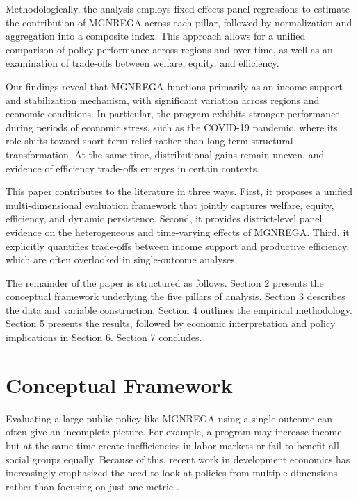 \documentclass[12pt]{article}
\begin{document}
Methodologically, the analysis employs fixed-effects panel regressions to estimate the contribution of MGNREGA across each pillar, followed by normalization and aggregation into a composite index. This approach allows for a unified comparison of policy performance across regions and over time, as well as an examination of trade-offs between welfare, equity, and efficiency.

Our findings reveal that MGNREGA functions primarily as an income-support and stabilization mechanism, with significant variation across regions and economic conditions. In particular, the program exhibits stronger performance during periods of economic stress, such as the COVID-19 pandemic, where its role shifts toward short-term relief rather than long-term structural transformation. At the same time, distributional gains remain uneven, and evidence of efficiency trade-offs emerges in certain contexts.

This paper contributes to the literature in three ways. First, it proposes a unified multi-dimensional evaluation framework that jointly captures welfare, equity, efficiency, and dynamic persistence. Second, it provides district-level panel evidence on the heterogeneous and time-varying effects of MGNREGA. Third, it explicitly quantifies trade-offs between income support and productive efficiency, which are often overlooked in single-outcome analyses.

The remainder of the paper is structured as follows. Section 2 presents the conceptual framework underlying the five pillars of analysis. Section 3 describes the data and variable construction. Section 4 outlines the empirical methodology. Section 5 presents the results, followed by economic interpretation and policy implications in Section 6. Section 7 concludes.

\section{Conceptual Framework}

Evaluating a large public policy like MGNREGA using a single outcome can often give an incomplete picture. For example, a program may increase income but at the same time create inefficiencies in labor markets or fail to benefit all social groups equally. Because of this, recent work in development economics has increasingly emphasized the need to look at policies from multiple dimensions rather than focusing on just one metric \citep{BanerjeeDuflo2011}.
\end{document}
